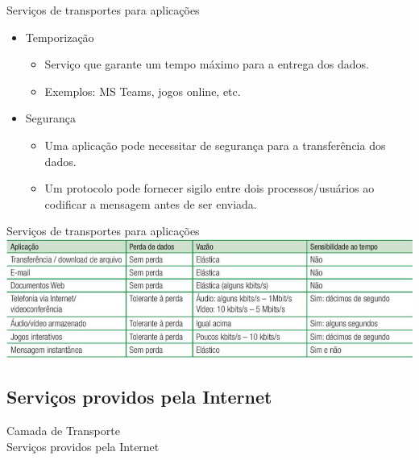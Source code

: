 \documentclass{libs/ufc_format}
\begin{document}
\begin{frame}{Serviços de transportes para aplicações}
    \begin{itemize}
        \justifying
        \item Temporização
            \begin{itemize}
                \justifying
                \item<1> Serviço que garante um tempo máximo para a entrega dos dados.
                \item<1> Exemplos: MS Teams, jogos online, etc.
            \end{itemize}
        \item<2> Segurança
            \begin{itemize}
                \justifying
                \item<2> Uma aplicação pode necessitar de segurança para a transferência dos dados.
                \item<2> Um protocolo pode fornecer sigilo entre dois processos/usuários ao codificar a mensagem antes de ser enviada.
            \end{itemize}
    \end{itemize}
\end{frame}

\begin{frame}{Serviços de transportes para aplicações}
    \includegraphics[width=\textwidth]{figuras/figura03_01}
\end{frame}

\subsection{Serviços providos pela Internet}

\begin{frame}{}
    \centering
    \Large
    Camada de Transporte\\
    \large
    Serviços providos pela Internet
\end{frame}
\end{document}
